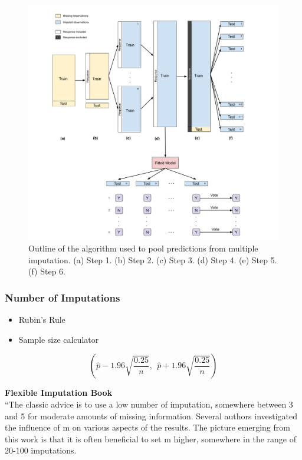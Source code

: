 \documentclass[12pt,]{article}
\providecommand{\tightlist}{%
  \setlength{\itemsep}{0pt}\setlength{\parskip}{0pt}}
\begin{document}
\begin{figure}[H]

{\centering \includegraphics[width=1\linewidth]{images/ensemble-imputation} 

}

\caption{\label{fig.ensemble-imputation}Outline of the algorithm used to pool predictions from multiple imputation.  (a) Step 1. (b) Step 2. (c) Step 3. (d) Step 4.  (e) Step 5.  (f) Step 6.}\label{fig:ensemble-imputation}
\end{figure}

\subsubsection{Number of Imputations}\label{number-of-imputations}

\begin{itemize}
\tightlist
\item
  Rubin's Rule
\item
  Sample size calculator
\end{itemize}

\[
\left( \hat{p} - 1.96\sqrt{\frac{0.25}{n}}, ~~\hat{p} + 1.96\sqrt{\frac{0.25}{n}} \right)
\]

\textbf{Flexible Imputation Book}\\
``The classic advice is to use a low number of imputation, somewhere
between 3 and 5 for moderate amounts of missing information. Several
authors investigated the influence of m on various aspects of the
results. The picture emerging from this work is that it is often
beneficial to set m higher, somewhere in the range of 20-100
imputations.
\end{document}
